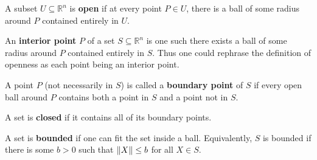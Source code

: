 \documentclass{article}
\begin{document}
A subset $U \subseteq \mathbb{R}^n$ is \textbf{open} if at every point $P \in U$, there is a ball of some radius around $P$
contained entirely in $U$.

An \textbf{interior point} $P$ of a set $S \subseteq \mathbb{R}^n$ is one such there exists a ball
of some radius around $P$ contained entirely in $S$. Thus one could rephrase the definition of openness
as each point being an interior point.

A point $P$ (not necessarily in $S$) is called a \textbf{boundary point} of $S$ if every open ball around 
$P$ contains both a point in $S$ and a point not in $S$.

A set is \textbf{closed} if it contains all of its boundary points.

A set is \textbf{bounded} if one can fit the set inside a ball. Equivalently, $S$ is bounded
if there is some $b>0$ such that $\norm{X} \leq b$ for all $X\in S$.
\end{document}
